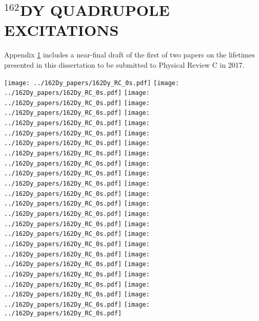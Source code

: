 \chapter{$^{162}$DY QUADRUPOLE EXCITATIONS}\label{appendix:162Dy_quad}


Appendix \ref{appendix:162Dy_quad} includes a near-final draft of the first of two papers on the lifetimes presented in this dissertation to be submitted to Physical Review C in 2017.

\newpage

\texttt{[image: ../162Dy\_papers/162Dy\_RC\_0s.pdf]}\newpage
\texttt{[image: ../162Dy\_papers/162Dy\_RC\_0s.pdf]}\newpage
\texttt{[image: ../162Dy\_papers/162Dy\_RC\_0s.pdf]}\newpage
\texttt{[image: ../162Dy\_papers/162Dy\_RC\_0s.pdf]}\newpage
\texttt{[image: ../162Dy\_papers/162Dy\_RC\_0s.pdf]}\newpage
\texttt{[image: ../162Dy\_papers/162Dy\_RC\_0s.pdf]}\newpage
\texttt{[image: ../162Dy\_papers/162Dy\_RC\_0s.pdf]}\newpage
\texttt{[image: ../162Dy\_papers/162Dy\_RC\_0s.pdf]}\newpage
\texttt{[image: ../162Dy\_papers/162Dy\_RC\_0s.pdf]}\newpage
\texttt{[image: ../162Dy\_papers/162Dy\_RC\_0s.pdf]}\newpage
\texttt{[image: ../162Dy\_papers/162Dy\_RC\_0s.pdf]}\newpage
\texttt{[image: ../162Dy\_papers/162Dy\_RC\_0s.pdf]}\newpage
\texttt{[image: ../162Dy\_papers/162Dy\_RC\_0s.pdf]}\newpage
\texttt{[image: ../162Dy\_papers/162Dy\_RC\_0s.pdf]}\newpage
\texttt{[image: ../162Dy\_papers/162Dy\_RC\_0s.pdf]}\newpage
\texttt{[image: ../162Dy\_papers/162Dy\_RC\_0s.pdf]}\newpage
\texttt{[image: ../162Dy\_papers/162Dy\_RC\_0s.pdf]}\newpage
\texttt{[image: ../162Dy\_papers/162Dy\_RC\_0s.pdf]}\newpage
\texttt{[image: ../162Dy\_papers/162Dy\_RC\_0s.pdf]}\newpage
\texttt{[image: ../162Dy\_papers/162Dy\_RC\_0s.pdf]}\newpage
\texttt{[image: ../162Dy\_papers/162Dy\_RC\_0s.pdf]}\newpage
\texttt{[image: ../162Dy\_papers/162Dy\_RC\_0s.pdf]}\newpage
\texttt{[image: ../162Dy\_papers/162Dy\_RC\_0s.pdf]}\newpage
\texttt{[image: ../162Dy\_papers/162Dy\_RC\_0s.pdf]}